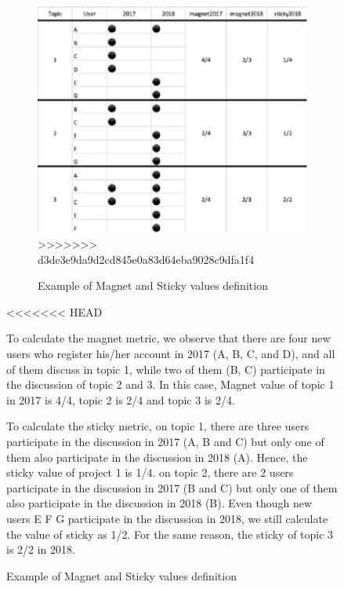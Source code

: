 \documentclass[conference]{IEEEtran}
\begin{document}
\begin{figure}[t]
\begin{figure}[t]
 \centering
 \includegraphics[width=.9\hsize]{img/ex.eps}  
>>>>>>> d3de3e9da9d2cd845e0a83d64eba9028c9dfa1f4
 \caption{Example of Magnet and Sticky values definition} 
 \label{fig:example2} 
\end{figure}
\smallskip
<<<<<<< HEAD

To calculate the magnet metric, we observe that there are four new users who register his/her account in 2017 (A, B, C, and D), and all of them discuss in topic 1, while two of them (B, C) participate in the discussion of topic 2 and 3. In this case, Magnet value of topic 1 in 2017 is 4/4, topic 2 is 2/4 and topic 3 is 2/4.

To calculate the sticky metric, on topic 1, there are three users participate in the discussion in 2017 (A, B and C) but only one of them also participate in the discussion in 2018 (A). Hence, the sticky value of project 1 is 1/4. on topic 2, there are 2 users participate in the discussion in 2017 (B and C) but only one of them also participate in the discussion in 2018 (B). Even though new users E F G participate in the discussion in 2018, we still calculate the value of sticky as 1/2. For the same reason, the sticky of topic 3 is 2/2 in 2018.\\


\end{figure}
\end{document}
